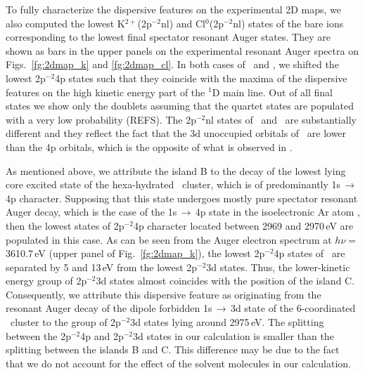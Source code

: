 To fully characterize the dispersive features on the experimental 2D maps, we also computed the lowest K$^{2+}$(2p$^{-2}$nl) and Cl$^{0}$(2p$^{-2}$nl) states of the bare ions corresponding to the lowest final spectator resonant Auger states. They are shown as bars in the upper panels on the experimental resonant Auger spectra on Figs.\ \ref{fg:2dmap_k} and \ref{fg:2dmap_cl}. In both cases of \ki~and \cli, we shifted the lowest 2p$^{-2}$4p states such that they coincide with the maxima of the dispersive features on the high kinetic energy part of the $^1$D main line. Out of all final states we show only the doublets assuming that the quartet states are populated with a very low probability (REFS). The 2p$^{-2}$nl states of \ki~and \cli~are substantially different and they reflect the fact that the 3d unoccupied orbitals of  \ki~are lower than the 4p orbitals, which is the opposite of what is observed in \cli.


As mentioned above, we attribute the island B to the decay of the lowest lying core excited state of the hexa-hydrated \ki~cluster, which is of predominantly 1s$\,\rightarrow\,$4p character. 
Supposing that this state undergoes mostly pure spectator resonant Auger decay, which is the case of the 1s$\,\rightarrow\,$4p state in the isoelectronic Ar atom \citep{ceolin15:022502}, then the lowest states of 2p$^{-2}$4p character located between 2969 and 2970\,eV are populated in this case. As can be seen from the Auger electron spectrum at $h\nu = $3610.7\,eV (upper panel of Fig.\ \ref{fg:2dmap_k}), the lowest 2p$^{-2}$4p states of \ki~are separated by 5 and 13\,eV from the lowest 2p$^{-2}$3d states. Thus, the lower-kinetic energy group of 2p$^{-2}$3d states almost coincides with the position of the island C. Consequently, we attribute  this dispersive feature as originating from the resonant Auger decay of the dipole forbidden 1s$\,\rightarrow\,$3d state of the 6-coordinated \ki~cluster to the group of 2p$^{-2}$3d states lying around 2975\,eV. The splitting between the 2p$^{-2}$4p and 2p$^{-2}$3d states in our calculation is smaller than the splitting between the islands B and C. This difference may be due to the fact that we do not account for the effect of the solvent molecules in our calculation.



